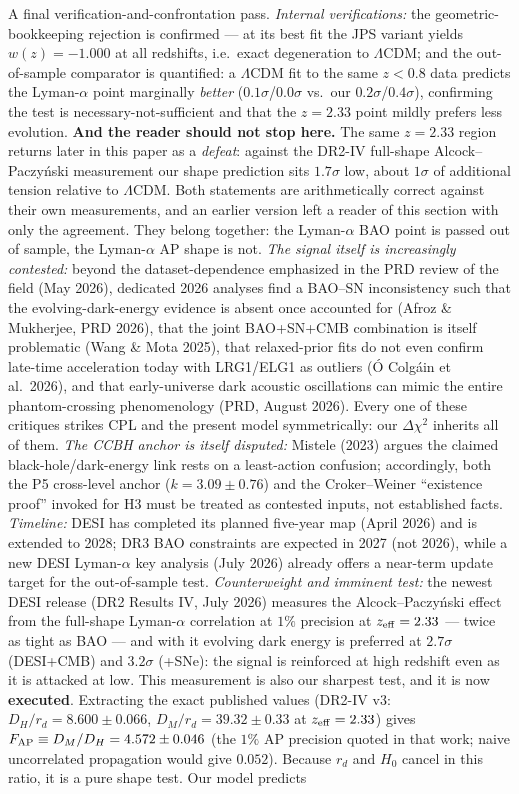 \documentclass[11pt]{article}
\begin{document}
A final verification-and-confrontation pass. \emph{Internal verifications:} the geometric-bookkeeping rejection is confirmed --- at its best fit the JPS variant yields $w(z) = -1.000$ at all redshifts, i.e.\ exact degeneration to $\Lambda$CDM; and the out-of-sample comparator is quantified: a $\Lambda$CDM fit to the same $z<0.8$ data predicts the Lyman-$\alpha$ point marginally \emph{better} ($0.1\sigma$/$0.0\sigma$ vs.\ our $0.2\sigma$/$0.4\sigma$), confirming the test is necessary-not-sufficient and that the $z=2.33$ point mildly prefers less evolution. \textbf{And the reader should not stop here.} The same $z = 2.33$ region returns later in this paper as a \emph{defeat}: against the DR2-IV full-shape Alcock--Paczy\'nski measurement our shape prediction sits $1.7\sigma$ low, about $1\sigma$ of additional tension relative to $\Lambda$CDM. Both statements are arithmetically correct against their own measurements, and an earlier version left a reader of this section with only the agreement. They belong together: the Lyman-$\alpha$ BAO point is passed out of sample, the Lyman-$\alpha$ AP shape is not. \emph{The signal itself is increasingly contested:} beyond the dataset-dependence emphasized in the PRD review of the field (May 2026), dedicated 2026 analyses find a BAO--SN inconsistency such that the evolving-dark-energy evidence is absent once accounted for (Afroz \& Mukherjee, PRD 2026), that the joint BAO+SN+CMB combination is itself problematic (Wang \& Mota 2025), that relaxed-prior fits do not even confirm late-time acceleration today with LRG1/ELG1 as outliers (\'O Colg\'ain et al.\ 2026), and that early-universe dark acoustic oscillations can mimic the entire phantom-crossing phenomenology (PRD, August 2026). Every one of these critiques strikes CPL and the present model symmetrically: our $\Delta\chi^2$ inherits all of them. \emph{The CCBH anchor is itself disputed:} Mistele (2023) argues the claimed black-hole/dark-energy link rests on a least-action confusion; accordingly, both the P5 cross-level anchor ($k = 3.09 \pm 0.76$) and the Croker--Weiner ``existence proof'' invoked for H3 must be treated as contested inputs, not established facts. \emph{Timeline:} DESI has completed its planned five-year map (April 2026) and is extended to 2028; DR3 BAO constraints are expected in 2027 (not 2026), while a new DESI Lyman-$\alpha$ key analysis (July 2026) already offers a near-term update target for the out-of-sample test. \emph{Counterweight and imminent test:} the newest DESI release (DR2 Results IV, July 2026) measures the Alcock--Paczy\'nski effect from the full-shape Lyman-$\alpha$ correlation at $1\%$ precision at $z_{\rm eff} = 2.33$ --- twice as tight as BAO --- and with it evolving dark energy is preferred at $2.7\sigma$ (DESI+CMB) and $3.2\sigma$ (+SNe): the signal is reinforced at high redshift even as it is attacked at low. This measurement is also our sharpest test, and it is now \textbf{executed}. Extracting the exact published values (DR2-IV v3: $D_H/r_d = 8.600 \pm 0.066$, $D_M/r_d = 39.32 \pm 0.33$ at $z_{\rm eff} = 2.33$) gives $F_{\rm AP} \equiv D_M/D_H = 4.572 \pm 0.046$ (the $1\%$ AP precision quoted in that work; naive uncorrelated propagation would give $0.052$). Because $r_d$ and $H_0$ cancel in this ratio, it is a pure shape test. Our model predicts 
\end{document}
